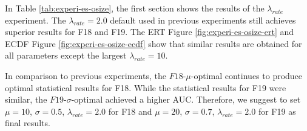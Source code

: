 \documentclass{article}
\begin{document}
In Table \ref{tab:experi-es-osize}, the first section shows the results of the $\lambda_{rate}$ experiment. The $\lambda_{rate}=2.0$ default used in previous experiments still achieves superior results for F18 and F19. The ERT Figure \ref{fig:experi-es-osize-ert} and ECDF Figure \ref{fig:experi-es-osize-ecdf} show that similar results are obtained for all parameters except the largest $\lambda_{rate}=10$.

In comparison to previous experiments, the $F18$-$\mu$-optimal continues to produce optimal statistical results for F18. While the statistical results for F19 were similar, the $F19$-$\sigma$-optimal achieved a higher AUC. Therefore, we suggest to set $\mu = 10$, $\sigma = 0.5$, $\lambda_{rate} = 2.0$ for  F18 and $\mu = 20$, $\sigma = 0.7$, $\lambda_{rate} = 2.0$ for  F19 as final results. 
\end{document}
